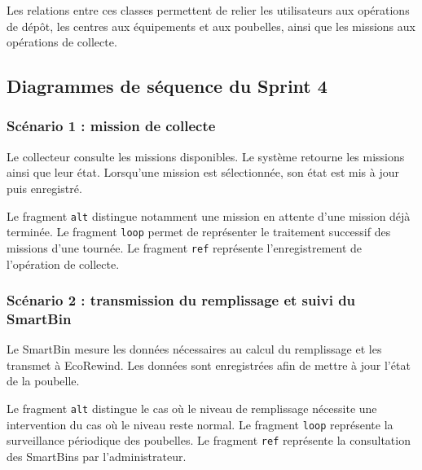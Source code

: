 {Les relations entre ces classes permettent de relier les utilisateurs aux opérations de dépôt, les centres aux équipements et aux poubelles, ainsi que les missions aux opérations de collecte.

\label{fig:r2_class}


\subsection{Diagrammes de séquence du Sprint 4}

\subsubsection{Scénario 1 : mission de collecte}

Le collecteur consulte les missions disponibles. Le système retourne les missions ainsi que leur état. Lorsqu'une mission est sélectionnée, son état est mis à jour puis enregistré.

Le fragment \texttt{alt} distingue notamment une mission en attente d'une mission déjà terminée. Le fragment \texttt{loop} permet de représenter le traitement successif des missions d'une tournée. Le fragment \texttt{ref} représente l'enregistrement de l'opération de collecte.

\label{fig:r2_s4_seq_missions}


\subsubsection{Scénario 2 : transmission du remplissage et suivi du SmartBin}

Le SmartBin mesure les données nécessaires au calcul du remplissage et les transmet à EcoRewind. Les données sont enregistrées afin de mettre à jour l'état de la poubelle.

Le fragment \texttt{alt} distingue le cas où le niveau de remplissage nécessite une intervention du cas où le niveau reste normal. Le fragment \texttt{loop} représente la surveillance périodique des poubelles. Le fragment \texttt{ref} représente la consultation des SmartBins par l'administrateur.

\label{fig:r2_s4_seq_smartbin}


}
